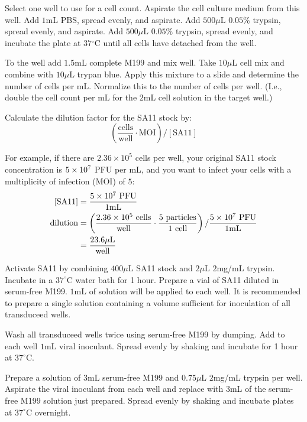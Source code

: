 Select one well to use for a cell count. Aspirate the cell culture medium from this well. Add $1$mL PBS, spread evenly, and aspirate. Add $500\mu$L $0.05$\% trypsin, spread evenly, and aspirate. Add $500\mu$L $0.05$\% trypsin, spread evenly, and incubate the plate at $37{^\circ}$C until all cells have detached from the well.

To the well add $1.5$mL complete M199 and mix well. Take $10\mu$L cell mix and combine with $10\mu$L trypan blue. Apply this mixture to a slide and determine the number of cells per mL. Normalize this to the number of cells per well. (I.e., double the cell count per mL for the $2$mL cell solution in the target well.)

Calculate the dilution factor for the SA11 stock by:
\begin{equation*}
\left(\frac{\text{cells}}{\text{well}}\cdot \text{MOI}\right)/\left[\text{SA11}\right]
\end{equation*}

For example, if there are $2.36\times 10^5$ cells per well, your original SA11 stock concentration is $5\times 10^{7}$ PFU per mL, and you want to infect your cells with a multiplicity of infection (MOI) of $5$:
\begin{align*}
\text{[SA11]} &= \frac{5\times 10^{7}\text{ PFU}}{1\text{mL}}\\
\text{dilution}&= \left(\frac{2.36\times 10^{5}\text{ cells}}{\text{well}}\cdot \frac{5\text{ particles}}{1\text{ cell}}\right)/\frac{5\times 10^{7}\text{ PFU}}{1\text{mL}}\\
&= \frac{23.6\mu\text{L}}{\text{well}}\\
\end{align*}

Activate SA11 by combining $400\mu$L SA11 stock and $2\mu$L $2$mg/mL trypsin. Incubate in a $37^{\circ}$C water bath for 1 hour. Prepare a vial of SA11 diluted in serum-free M199. $1$mL of solution will be applied to each well. It is recommended to prepare a single solution containing a volume sufficient for inoculation of all transduceed wells.

Wash all transduceed wells twice using serum-free M199 by dumping. Add to each well $1$mL viral inoculant. Spread evenly by shaking and incubate for 1 hour at $37^{\circ}$C.

Prepare a solution of $3$mL serum-free M199 and $0.75\mu$L $2$mg/mL trypsin per well. Aspirate the viral inoculant from each well and replace with $3$mL of the serum-free M199 solution just prepared. Spread evenly by shaking and incubate plates at $37^{\circ}$C overnight.

